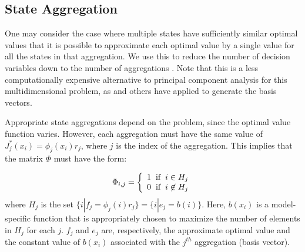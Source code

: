 \documentclass[conference]{IEEEtran}
\begin{document}


 \subsection{State Aggregation}
    
    One may consider the case where multiple states have sufficiently similar optimal values that it is possible to approximate each optimal value by a single value for all the states in that aggregation. We use this to reduce the number of decision variables down to the number of aggregations \cite{5717627}. Note that this is a less computationally expensive alternative to principal component analysis for this multidimensional problem, as \cite{PCA2015} and others have applied to generate the basis vectors.%
    
    Appropriate state aggregations depend on the problem, since the optimal value function varies. %
    However, each aggregation must have the same value of $J^{*}_{j}(x_{i}) = \phi_{j}(x_{i})r_{j}$, where $j$ is the index of the aggregation. This implies that the matrix $\Phi$ must have the form:
    
    \begin{displaymath}
        \Phi_{i,j}=\left\{
            \begin{array}{l}
            1 \hspace{0.2cm} \text{if} \hspace{0.2cm} i\in H_{j}\\
            0 \hspace{0.2cm} \text{if} \hspace{0.2cm} i\not\in H_{j}
            \end{array}
            \right.
    \end{displaymath}where $H_{j}$ is the set $\{i|f_{j} = \phi_{j}(i)r_{j}\}=\{i|e_{j} = b(i)\}$. Here, $b(x_{i})$ is a model-specific function that is appropriately chosen to maximize the number of elements in $H_{j}$ for each $j$. $f_{j}$ and $e_{j}$ are, respectively, the approximate optimal value and the constant value of $b(x_{i})$ associated with the $j^{th}$ aggregation (basis vector).
    
\end{document}
